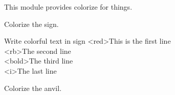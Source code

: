 
This module provides colorize for things.

Colorize the sign.

\begin{example}{Write colorful text in sign}
    <red>This is the first line\\
    <rb>The second line\\
    <bold>The third line\\
    <i>The last line
\end{example}

Colorize the anvil.
